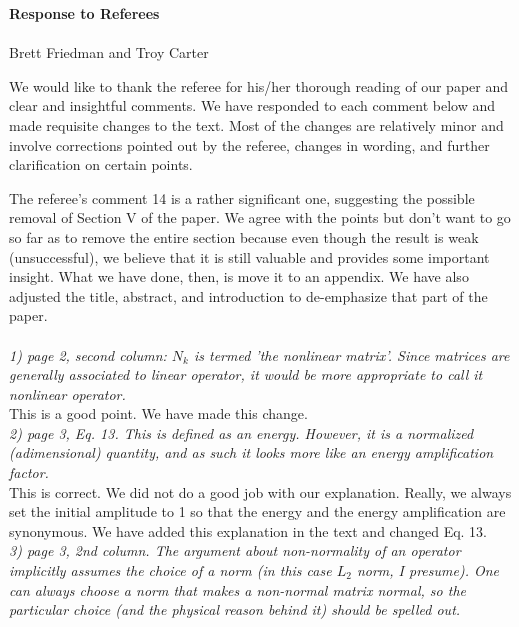 \documentclass[12pt]{article}
\begin{document}
{\bf Response to Referees \\
 \\} 
Brett Friedman and Troy Carter

\hrulefill

We would like to thank the referee for his/her thorough reading of our paper and clear and insightful comments. We have responded to each comment below and made requisite changes to the text.
Most of the changes are relatively minor and involve corrections pointed out by the referee, changes in wording, and further clarification on certain points.

The referee's comment 14 is a rather significant one, suggesting the possible removal of Section V of the paper. 
We agree with the points but don't want to go so far as to remove the entire section because even though the result is weak (unsuccessful), 
we believe that it is still valuable and provides some important insight. What we have done, then, is move it to an appendix. 
We have also adjusted the title, abstract, and introduction to de-emphasize that part of the paper. \\ \\


\emph{1) page 2, second column: $N_k$ is termed 'the nonlinear matrix'. Since matrices are generally associated to linear operator, it would be more appropriate to call it nonlinear operator. } \\

This is a good point. We have made this change. \\

\emph{2) page 3, Eq. 13. This is defined as an energy. However, it is a normalized (adimensional) quantity, and as such it looks more like an energy amplification factor.}\\

This is correct. We did not do a good job with our explanation. Really, we always set the initial amplitude to 1 so that the energy and the energy amplification are synonymous.
We have added this explanation in the text and changed Eq. 13. \\


\emph{3) page 3, 2nd column. The argument about non-normality of an operator implicitly assumes the choice of a norm (in this case $L_2$ norm, I presume). One can always choose a norm that makes a non-normal matrix normal, so the particular choice (and the physical reason behind it) should be spelled out. }\\
\end{document}
